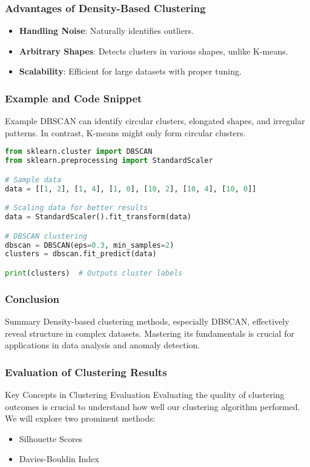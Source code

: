 \documentclass{beamer}
\begin{document}
\begin{frame}
    \frametitle{Advantages of Density-Based Clustering}
    \begin{itemize}
        \item \textbf{Handling Noise}: Naturally identifies outliers.
        \item \textbf{Arbitrary Shapes}: Detects clusters in various shapes, unlike K-means.
        \item \textbf{Scalability}: Efficient for large datasets with proper tuning.
    \end{itemize}
\end{frame}

\begin{frame}[fragile]
    \frametitle{Example and Code Snippet}
    \begin{block}{Example}
        DBSCAN can identify circular clusters, elongated shapes, and irregular patterns. In contrast, K-means might only form circular clusters.
    \end{block}
    \begin{lstlisting}[language=Python]
from sklearn.cluster import DBSCAN
from sklearn.preprocessing import StandardScaler

# Sample data
data = [[1, 2], [1, 4], [1, 0], [10, 2], [10, 4], [10, 0]]

# Scaling data for better results
data = StandardScaler().fit_transform(data)

# DBSCAN clustering
dbscan = DBSCAN(eps=0.3, min_samples=2)
clusters = dbscan.fit_predict(data)

print(clusters)  # Outputs cluster labels
    \end{lstlisting}
\end{frame}

\begin{frame}
    \frametitle{Conclusion}
    \begin{block}{Summary}
        Density-based clustering methods, especially DBSCAN, effectively reveal structure in complex datasets. Mastering its fundamentals is crucial for applications in data analysis and anomaly detection.
    \end{block}
\end{frame}

\begin{frame}[fragile]
    \frametitle{Evaluation of Clustering Results}
    \begin{block}{Key Concepts in Clustering Evaluation}
        Evaluating the quality of clustering outcomes is crucial to understand how well our clustering algorithm performed. We will explore two prominent methods:
        \begin{itemize}
            \item Silhouette Scores
            \item Davies-Bouldin Index
        \end{itemize}
    \end{block}
\end{frame}
\end{document}
